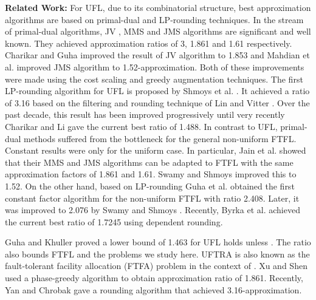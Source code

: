 \documentclass[10pt]{llncs}
\begin{document}
\textbf{Related Work: }For UFL, due to its combinatorial structure,
best approximation algorithms are based on primal-dual and LP-rounding
techniques. In the stream of primal-dual algorithms, JV \cite{jain01approximation},
MMS \cite{Mohammad1.861} and JMS \cite{Jain02greedy} algorithms
are significant and well known. They achieved approximation ratios
of 3, 1.861 and 1.61 respectively. Charikar and Guha \cite{Charikar051.7281.853}
improved the result of JV algorithm to 1.853 and Mahdian et al. \cite{Mohammad06FLP}
improved JMS algorithm to 1.52-approximation. Both of these improvements
were made using the cost scaling and greedy augmentation techniques.
The first LP-rounding algorithm for UFL is proposed by Shmoys et al.
\cite{Shmoys97FL}. It achieved a ratio of 3.16 based on the filtering
and rounding technique of Lin and Vitter \cite{Lin92filting}. Over
the past decade, this result has been improved progressively until
very recently Charikar and Li \cite{charikar2011novel} gave the current
best ratio of 1.488. In contrast to UFL, primal-dual methods suffered
from the bottleneck \cite{Jain00FTFL} for the general non-uniform
FTFL. Constant results were only for the uniform case. In particular,
Jain et al. \cite{Jain03dualfitting} showed that their MMS and JMS
algorithms can be adapted to FTFL with the same approximation factors
of 1.861 and 1.61. Swamy and Shmoys \cite{Swamy08FTFL2.076} improved
this to 1.52. On the other hand, based on LP-rounding Guha et al.
\cite{Guha01FTFL2.47,Guha03FTFL2.41} obtained the first constant
factor algorithm for the non-uniform FTFL with ratio 2.408. Later,
it was improved to 2.076 by Swamy and Shmoys \cite{Swamy08FTFL2.076}.
Recently, Byrka et al. \cite{JaroslawFTFL1.725} achieved the current
best ratio of 1.7245 using dependent rounding. 

Guha and Khuller \cite{Guha99greedy} proved a lower bound of 1.463
for UFL holds unless  \cite{chudak2005improved}. The ratio
also bounds FTFL and the problems we study here. UFTRA is also known
as the fault-tolerant facility allocation (FTFA) problem in the context
of \cite{shihongftfa}. Xu and Shen used a phase-greedy algorithm
to obtain approximation ratio of 1.861. Recently, Yan and Chrobak
\cite{yan2011approximation} gave a rounding algorithm that achieved
3.16-approximation.
\end{document}
